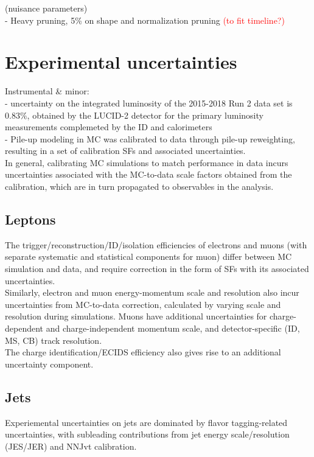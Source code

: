 \documentclass[../thesis.tex]{subfiles}
\begin{document}
\vspace{-1\baselineskip}
(nuisance parameters)\\
- Heavy pruning, 5\% on shape and normalization pruning \textcolor{red}{(to fit timeline?)}

\section{Experimental uncertainties}
\label{sec:sysexp}
Instrumental \& minor:\\
- uncertainty on the integrated luminosity of the 2015-2018 Run 2 data set is $0.83\%$, obtained by the LUCID-2 detector for the primary luminosity measurements complemeted by the ID and calorimeters\\
- Pile-up modeling in MC was calibrated to data through pile-up reweighting, resulting in a set of calibration SFs and associated uncertainties. \\
In general, calibrating MC simulations to match performance in data incurs uncertainties associated with the MC-to-data scale factors obtained from the calibration, which are in turn propagated to observables in the analysis.

\subsection{Leptons}
The trigger/reconstruction/ID/isolation efficiencies of electrons and muons (with separate systematic and statistical components for muon) differ between MC simulation and data, and require correction in the form of SFs with its  associated uncertainties.\\
Similarly, electron and muon energy-momentum scale and resolution also incur uncertainties from MC-to-data correction, calculated by varying scale and resolution during simulations. Muons have additional uncertainties for charge-dependent and charge-independent momentum scale, and detector-specific (ID, MS, CB) track resolution.\\
The charge identification/ECIDS efficiency also gives rise to an additional uncertainty component.\\

\subsection{Jets}
Experiemental uncertainties on jets are dominated by flavor tagging-related uncertainties, with subleading contributions from jet energy scale/resolution (JES/JER) and NNJvt calibration.\\
\end{document}
